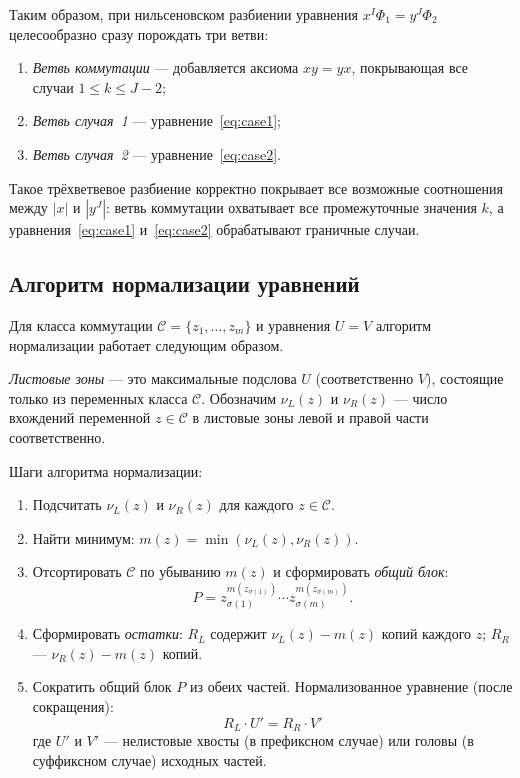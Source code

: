 \documentclass[14pt, russian]{scrartcl}
\begin{document}
\medskip
Таким образом, при нильсеновском разбиении уравнения $x^I \Phi_1 = y^J \Phi_2$
целесообразно сразу порождать три ветви:
\begin{enumerate}
  \item \emph{Ветвь коммутации} --- добавляется аксиома $xy = yx$, покрывающая
    все случаи $1 \leq k \leq J-2$;
  \item \emph{Ветвь случая~1} --- уравнение~\eqref{eq:case1};
  \item \emph{Ветвь случая~2} --- уравнение~\eqref{eq:case2}.
\end{enumerate}
Такое трёхветвевое разбиение корректно покрывает все возможные соотношения
между $|x|$ и $|y^J|$: ветвь коммутации охватывает все промежуточные значения $k$,
а уравнения~\eqref{eq:case1} и~\eqref{eq:case2} обрабатывают граничные случаи.

\subsection{Алгоритм нормализации уравнений}

Для класса коммутации $\mathcal{C} = \{z_1, \ldots, z_m\}$ и уравнения $U = V$
алгоритм нормализации работает следующим образом.

\emph{Листовые зоны} --- это максимальные подслова $U$ (соответственно $V$),
состоящие только из переменных класса $\mathcal{C}$. Обозначим $\nu_L(z)$ и
$\nu_R(z)$ --- число вхождений переменной $z \in \mathcal{C}$ в листовые зоны
левой и правой части соответственно.

Шаги алгоритма нормализации:
\begin{enumerate}
\item Подсчитать $\nu_L(z)$ и $\nu_R(z)$ для каждого $z \in \mathcal{C}$.
\item Найти минимум: $m(z) = \min(\nu_L(z), \nu_R(z))$.
\item Отсортировать $\mathcal{C}$ по убыванию $m(z)$ и сформировать
  \emph{общий блок}:
  \[
  P = z_{\sigma(1)}^{m(z_{\sigma(1)})} \cdots z_{\sigma(m)}^{m(z_{\sigma(m)})}.
  \]
\item Сформировать \emph{остатки}: $R_L$ содержит $\nu_L(z) - m(z)$ копий
  каждого $z$; $R_R$ --- $\nu_R(z) - m(z)$ копий.
\item Сократить общий блок $P$ из обеих частей. Нормализованное уравнение
  (после сокращения):
\begin{equation}\label{eq:norm_prefix}
R_L \cdot U' = R_R \cdot V'
\end{equation}
где $U'$ и $V'$ --- нелистовые хвосты (в префиксном случае) или головы
(в суффиксном случае) исходных частей.
\end{enumerate}
\end{document}
